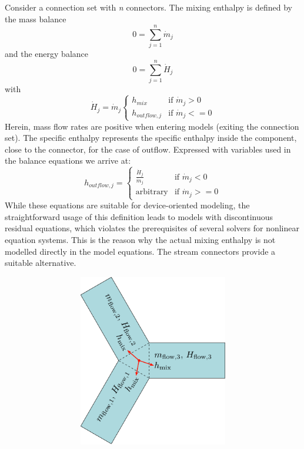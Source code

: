 \documentclass[10pt,a4paper]{report}
\begin{document}
Consider a connection set with \emph{n} connectors. The mixing enthalpy
is defined by the mass balance
\begin{equation*}
0=\sum_{j=1}^n\dot{m}_j
\end{equation*}
and the energy balance
\begin{equation*}
0=\sum_{j=1}^n\dot{H}_j
\end{equation*}
with
\begin{equation*}
\dot{H}_j=\dot{m}_j 
\begin{cases}
h_{mix}&\text{if $\dot{m}_j>0$}\\
h_{outflow,j}&\text{if $\dot{m}_j<=0$}
\end{cases}
\end{equation*}
Herein, mass flow rates are positive when entering models (exiting the
connection set). The specific enthalpy represents the specific enthalpy
inside the component, close to the connector, for the case of outflow.
Expressed with variables used in the balance equations we arrive at:
\begin{equation*}
h_{outflow,j}=
\begin{cases}
\frac{\dot{H}_j}{\dot{m}_j}&\text{if $\dot{m}_j<0$}\\
\textrm{arbitrary}&\text{if $\dot{m}_j>=0$}
\end{cases}
\end{equation*}
While these equations are suitable for device-oriented modeling, the
straightforward usage of this definition leads to models with
discontinuous residual equations, which violates the prerequisites of
several solvers for nonlinear equation systems. This is the reason why
the actual mixing enthalpy is not modelled directly in the model
equations. The stream connectors provide a suitable alternative.

\includegraphics[width=6.33819in,height=2.97083in]{media/fluidmix}
\end{document}

